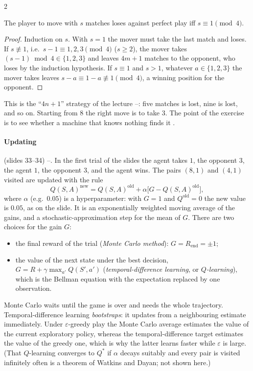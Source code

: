 \begin{paracol}{2}
\begin{proposition}\label{ch16:prop-nim}
The player to move with $s$ matches loses against perfect play iff $s\equiv1\pmod 4$.
\end{proposition}
\begin{proof}
Induction on $s$. With $s=1$ the mover must take the last match and loses. If $s\not\equiv1$, i.e.\ $s-1\equiv1,2,3\pmod 4$ ($s\ge2$), the mover takes $(s-1)\bmod4\in\{1,2,3\}$ and leaves $4m+1$ matches to the opponent, who loses by the induction hypothesis. If $s\equiv1$ and $s>1$,
whatever $a\in\{1,2,3\}$ the mover takes leaves $s-a\equiv1-a\not\equiv1\pmod4$, a winning position for the opponent.
\end{proof}
This is the ``$4n+1$'' strategy of the lecture --: five matches is lost, nine is lost, and so on. Starting from $8$ the right move is to take $3$. The point of the exercise is to see whether a machine that knows nothing finds it
.

\paragraph{Updating} (slides 33--34) --. In the first trial of the slides the agent takes $1$, the opponent $3$, the agent $1$, the opponent $3$, and the agent wins. The pairs $(8,1)$ and $(4,1)$ visited are updated with the rule
\begin{equation}\label{ch16:eq-qupdate}
  Q(S,A)^{\text{new}}=Q(S,A)^{\text{old}}+\alpha\bigl[G-Q(S,A)^{\text{old}}\bigr],
\end{equation}
where $\alpha$ (e.g.\ $0.05$) is a hyperparameter: with $G=1$ and $Q^{\text{old}}=0$ the new value is $0.05$, as on the slide. It is an exponentially weighted moving average of the gains, and a stochastic-approximation step for the mean of $G$. There are two choices for the gain $G$:
\begin{itemize}
  \item the final reward of the trial (\emph{Monte Carlo method}): $G=R_{\text{end}}=\pm1$;
  \item the value of the next state under the best decision, $G=R+\gamma\max_{a'}Q(S',a')$ (\emph{temporal-difference learning}, or \emph{$Q$-learning}), which is the Bellman equation with the expectation replaced by one observation.
\end{itemize}
Monte Carlo waits until the game is over and needs the whole trajectory. Temporal-difference learning \emph{bootstraps}: it updates from a neighbouring estimate immediately. Under $\varepsilon$-greedy play the Monte Carlo average estimates the value of the
current exploratory policy, whereas the temporal-difference target estimates the value of the greedy one, which is why the latter learns faster while $\varepsilon$ is large. (That $Q$-learning converges to $Q^*$ if $\alpha$ decays suitably and every pair is visited infinitely often is a theorem of Watkins and Dayan; not shown here.)


\end{paracol}
